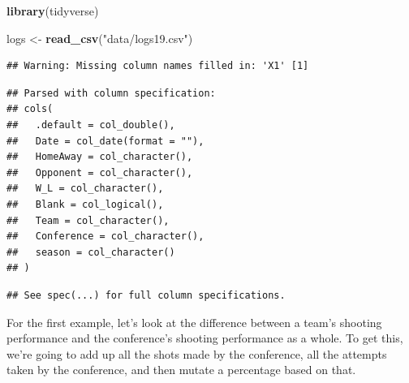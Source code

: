 \documentclass[]{book}
\newenvironment{Shaded}{\begin{snugshade}}{\end{snugshade}}
\newcommand{\KeywordTok}[1]{\textcolor[rgb]{0.13,0.29,0.53}{\textbf{#1}}}
\newcommand{\DataTypeTok}[1]{\textcolor[rgb]{0.13,0.29,0.53}{#1}}
\newcommand{\StringTok}[1]{\textcolor[rgb]{0.31,0.60,0.02}{#1}}
\newcommand{\OperatorTok}[1]{\textcolor[rgb]{0.81,0.36,0.00}{\textbf{#1}}}
\newcommand{\NormalTok}[1]{#1}
\begin{document}
\begin{Shaded}
\begin{Highlighting}[]
\KeywordTok{library}\NormalTok{(tidyverse)}
\end{Highlighting}
\end{Shaded}

\begin{Shaded}
\begin{Highlighting}[]
\NormalTok{logs <-}\StringTok{ }\KeywordTok{read_csv}\NormalTok{(}\StringTok{"data/logs19.csv"}\NormalTok{)}
\end{Highlighting}
\end{Shaded}

\begin{verbatim}
## Warning: Missing column names filled in: 'X1' [1]
\end{verbatim}

\begin{verbatim}
## Parsed with column specification:
## cols(
##   .default = col_double(),
##   Date = col_date(format = ""),
##   HomeAway = col_character(),
##   Opponent = col_character(),
##   W_L = col_character(),
##   Blank = col_logical(),
##   Team = col_character(),
##   Conference = col_character(),
##   season = col_character()
## )
\end{verbatim}

\begin{verbatim}
## See spec(...) for full column specifications.
\end{verbatim}

For the first example, let's look at the difference between a team's
shooting performance and the conference's shooting performance as a
whole. To get this, we're going to add up all the shots made by the
conference, all the attempts taken by the conference, and then mutate a
percentage based on that.

\begin{Shaded}
\end{Shaded}
\end{document}
